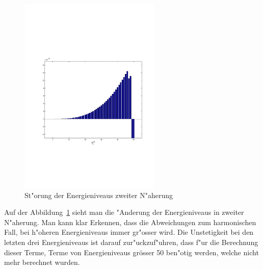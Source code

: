 \begin{refsection}
\begin{figure}[h]	%
\centering
\includegraphics[width=0.6\textwidth]{anharmonisch/images/x4/EK2.pdf}
\caption{St"orung der Energieniveaus zweiter N"aherung
\label{skript:x4_EK2}}
\end{figure}

Auf der Abbildung~\ref{skript:x4_EK2} sieht man die "Anderung der Energieniveaus in zweiter N"aherung. Man kann klar Erkennen, dass die Abweichungen zum harmonischen Fall, bei h"oheren Energieniveaus immer gr"osser wird. Die Unstetigkeit bei den letzten drei Energieniveaus ist darauf zur"uckzuf"uhren, dass f"ur die Berechnung dieser Terme, Terme von Energieniveaus grösser 50 ben"otig werden, welche nicht mehr berechnet wurden.


\end{refsection}
